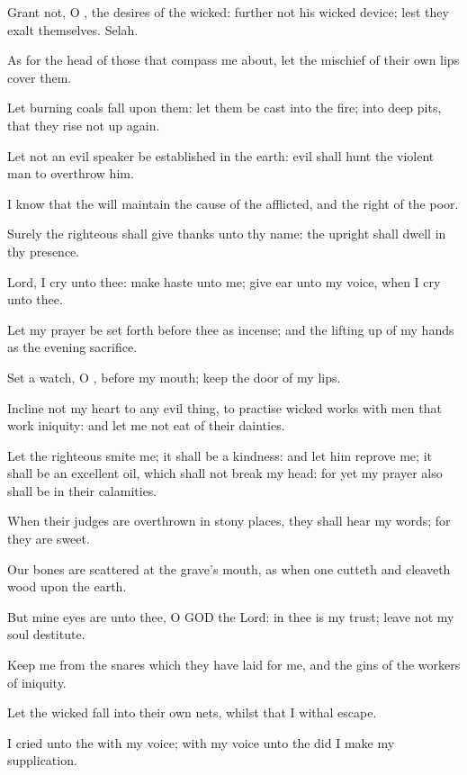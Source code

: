 \Verse Grant not, O \LORD, the desires of the wicked: further not his wicked device; lest they exalt themselves. Selah.

\Verse As for the head of those that compass me about, let the mischief of their own lips cover them.

\Verse Let burning coals fall upon them: let them be cast into the fire; into deep pits, that they rise not up again.

\Verse Let not an evil speaker be established in the earth: evil shall hunt the violent man to overthrow him.

\Verse I know that the \LORD will maintain the cause of the afflicted, and the right of the poor.

\Verse Surely the righteous shall give thanks unto thy name: the upright shall dwell in thy presence.




\Chapter
\Verse Lord, I cry unto thee: make haste unto me; give ear unto my voice, when I cry unto thee.

\Verse Let my prayer be set forth before thee as incense; and the lifting up of my hands as the evening sacrifice.

\Verse Set a watch, O \LORD, before my mouth; keep the door of my lips.

\Verse Incline not my heart to any evil thing, to practise wicked works with men that work iniquity: and let me not eat of their dainties.

\Verse Let the righteous smite me; it shall be a kindness: and let him reprove me; it shall be an excellent oil, which shall not break my head: for yet my prayer also shall be in their calamities.

\Verse When their judges are overthrown in stony places, they shall hear my words; for they are sweet.

\Verse Our bones are scattered at the grave's mouth, as when one cutteth and cleaveth wood upon the earth.

\Verse But mine eyes are unto thee, O GOD the Lord: in thee is my trust; leave not my soul destitute.

\Verse Keep me from the snares which they have laid for me, and the gins of the workers of iniquity.

\Verse Let the wicked fall into their own nets, whilst that I withal escape.




\Chapter
\Verse I cried unto the \LORD with my voice; with my voice unto the \LORD did I make my supplication.


